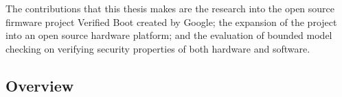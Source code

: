 \documentclass[../report.tex]{subfiles}
\begin{document}
The contributions that this thesis makes are the research into the open source firmware project Verified Boot created by Google; the expansion of the project into an open source hardware platform; and the evaluation of bounded model checking on verifying security properties of both hardware and software.

\subsection{Overview}

\pagebreak
\end{document}
